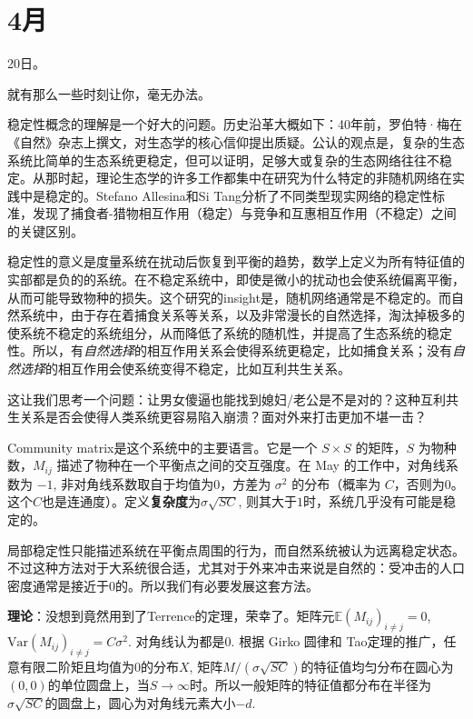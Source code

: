 \chapter{4月}

20日。

\cite{asllani2018structure}
就有那么一些时刻让你，毫无办法。

稳定性概念的理解是一个好大的问题。历史沿革大概如下：40年前，罗伯特·梅在《自然》杂志上撰文，对生态学的核心信仰提出质疑。公认的观点是，复杂的生态系统比简单的生态系统更稳定，但可以证明，足够大或复杂的生态网络往往不稳定。从那时起，理论生态学的许多工作都集中在研究为什么特定的非随机网络在实践中是稳定的。Stefano Allesina和Si Tang分析了不同类型现实网络的稳定性标准，发现了捕食者-猎物相互作用（稳定）与竞争和互惠相互作用（不稳定）之间的关键区别。

稳定性的意义是度量系统在扰动后恢复到平衡的趋势，数学上定义为所有特征值的实部都是负的的系统。在不稳定系统中，即使是微小的扰动也会使系统偏离平衡，从而可能导致物种的损失。这个研究的insight是，随机网络通常是不稳定的。而自然系统中，由于存在着捕食关系等关系，以及非常漫长的自然选择，淘汰掉极多的使系统不稳定的系统组分，从而降低了系统的随机性，并提高了生态系统的稳定性。所以，有\textit{自然选择}的相互作用关系会使得系统更稳定，比如捕食关系；没有\textit{自然选择}的相互作用会使系统变得不稳定，比如互利共生关系。

这让我们思考一个问题：让男女傻逼也能找到媳妇/老公是不是对的？这种互利共生关系是否会使得人类系统更容易陷入崩溃？面对外来打击更加不堪一击？

Community matrix是这个系统中的主要语言。它是一个 $ S\times S$ 的矩阵，$S$ 为物种数，$M_{ij}$ 描述了物种在一个平衡点之间的交互强度。在 May 的工作中，对角线系数为 $-1$, 非对角线系数取自于均值为$0$，方差为 $\sigma^2$ 的分布（概率为 $C$，否则为0。这个$C$也是连通度）。定义\textbf{复杂度}为$\sigma \sqrt{SC}$, 则其大于$1$时，系统几乎没有可能是稳定的。

局部稳定性只能描述系统在平衡点周围的行为，而自然系统被认为远离稳定状态。不过这种方法对于大系统很合适，尤其对于外来冲击来说是自然的：受冲击的人口密度通常是接近于$0$的。所以我们有必要发展这套方法。

\textbf{理论}：没想到竟然用到了Terrence的定理，荣幸了。矩阵元$\mathbb{E} (M_{ij})_{i\ne j} = 0$, $\text{Var} (M_{ij})_{i\ne j} = C\sigma^2$. 对角线认为都是$0$. 根据 Girko 圆律和 Tao定理的推广，任意有限二阶矩且均值为$0$的分布$X$, 矩阵$M/(\sigma \sqrt{SC})$的特征值均匀分布在圆心为$(0,0)$的单位圆盘上，当$S\to \infty$时。所以一般矩阵的特征值都分布在半径为$\sigma\sqrt{SC}$的圆盘上，圆心为对角线元素大小$-d$. 

